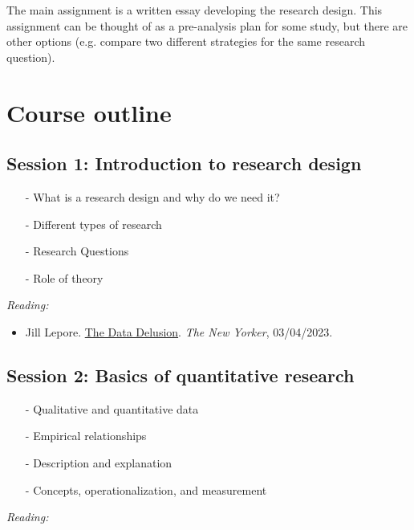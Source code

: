 \documentclass[12pt, a4paper]{article}
\begin{document}
The main assignment is a written essay developing the research design. This assignment can be thought of as a pre-analysis plan for some study, but there are other options (e.g. compare two different strategies for the same research question).

\newpage
\section{Course outline}

\subsection*{Session 1: Introduction to research design}

\begin{itemize}
\setlength\itemsep{-5pt}
  \item[-] What is a research design and why do we need it?
  \item[-] Different types of research
  \item[-] Research Questions
  \item[-] Role of theory
\end{itemize}

\textit{Reading:}

\begin{itemize}
  \item Jill Lepore. \href{https://www.newyorker.com/magazine/2023/04/03/the-data-delusion}{The Data Delusion}. \textit{The New Yorker}, 03/04/2023.
\end{itemize}


\subsection*{Session 2: Basics of quantitative research}

\begin{itemize}
\setlength\itemsep{-5pt}
  \item[-] Qualitative and quantitative data
  \item[-] Empirical relationships
  \item[-] Description and explanation
  \item[-] Concepts, operationalization, and measurement
\end{itemize}

\textit{Reading:}
\end{document}
